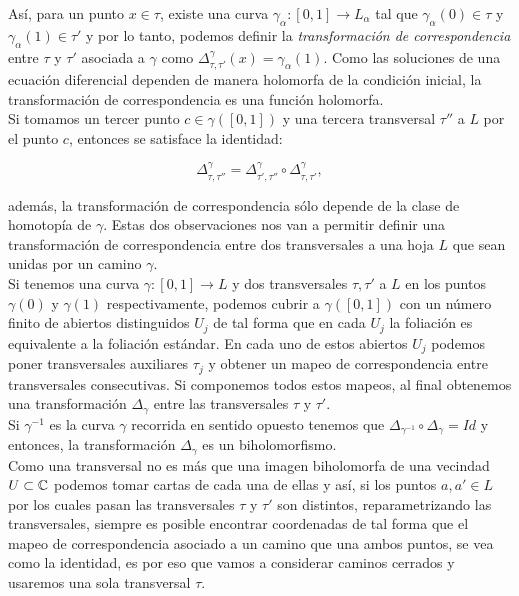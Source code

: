 Así, para un punto $x\in\tau$, existe una curva $\gamma_{\alpha}\colon[0,1]\rightarrow L_{\alpha}$ tal que $\gamma_{\alpha}(0)\in\tau$ y $\gamma_{\alpha}(1)\in\tau'$ y por lo tanto, podemos definir la  \emph{transformación de correspondencia} entre $\tau$  y $\tau'$ asociada a $\gamma$ como $\Delta^{\gamma}_{\tau,\tau'}(x)=\gamma_{\alpha}(1)$. Como las soluciones de una ecuación diferencial dependen de manera holomorfa de la condición inicial, la transformación de correspondencia es una función holomorfa.\\

Si tomamos un tercer punto $c\in\gamma([0,1])$ y una tercera transversal $\tau''$ a $L$ por el punto $c$, entonces se satisface la identidad:

\begin{equation}
\label{IdentidadCorrespondencia}
\Delta^{\gamma}_{\tau,\tau''}=\Delta^{\gamma}_{\tau',\tau''}\circ\Delta^{\gamma}_{\tau,\tau'},
\end{equation}

\noindent además, la transformación de correspondencia sólo depende de la clase de homotopía de $\gamma$. Estas dos observaciones nos van a permitir definir una transformación de correspondencia entre dos transversales a una hoja $L$ que sean unidas por un camino $\gamma$.\\  

Si tenemos una curva $\gamma\colon [0,1]\rightarrow L$ y dos transversales $\tau,\tau'$ a $L$ en los puntos $\gamma(0)$ y $\gamma(1)$ respectivamente, podemos cubrir a $\gamma([0,1])$ con un número finito de abiertos  distinguidos $U_{j}$ de tal forma que en cada $U_{j}$ la foliación es equivalente a la foliación estándar. En cada uno de estos abiertos $U_{j}$ podemos poner transversales auxiliares $\tau_{j}$ y obtener un mapeo de correspondencia entre transversales consecutivas. Si componemos todos estos mapeos, al final obtenemos una transformación $\Delta_{\gamma}$ entre las transversales $\tau$ y $\tau'$.\\

Si $\gamma^{-1}$ es la curva $\gamma$ recorrida en sentido opuesto tenemos que $\Delta_{\gamma^{-1}}\circ\Delta_{\gamma}=Id$ y entonces, la transformación $\Delta_{\gamma}$ es un biholomorfismo.\\

Como una transversal no es más que una imagen biholomorfa de una vecindad $U\subset\mathbb{C}$ podemos tomar cartas de cada una de ellas y  así, si los puntos $a,a'\in L$ por los cuales pasan las transversales $\tau$ y $\tau'$ son distintos, reparametrizando las transversales, siempre es posible encontrar coordenadas de tal forma que el mapeo de correspondencia asociado a un camino que una ambos puntos, se vea como la identidad, es por eso que vamos a considerar caminos cerrados y usaremos una sola transversal $\tau$.

